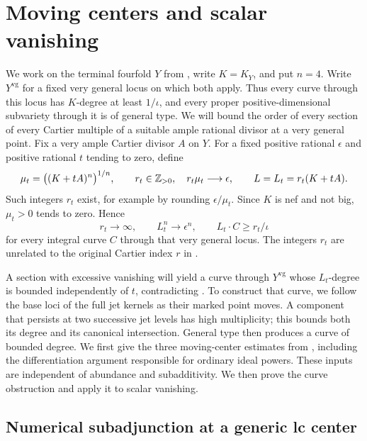 \section{Moving centers and scalar vanishing}
\label{sec:moving-centers}

We work on the terminal fourfold $Y$ from , write
$K=K_Y$, and put $n=4$. Write $Y^{\mathrm{vg}}$ for a fixed very
general locus on which both 
apply. Thus every curve through this locus has $K$-degree at least
$1/\iota$, and every proper positive-dimensional subvariety through
it is of general type. We will bound the order of every section of
every Cartier multiple of a suitable ample rational divisor at a
very general point. Fix a very ample Cartier divisor $A$ on $Y$.
For a fixed positive rational $\epsilon$ and positive rational $t$
tending to zero, define
\begin{equation}
\label{eq:small-volume-polarization}
 \mu_t=\bigl((K+tA)^n\bigr)^{1/n},\qquad
 r_t\in\mathbb Z_{>0},\quad r_t\mu_t\longrightarrow\epsilon,
 \qquad L=L_t=r_t(K+tA).
\end{equation}
Such integers $r_t$ exist, for example by rounding $\epsilon/\mu_t$.
Since $K$ is nef and not big, $\mu_t>0$ tends to zero. Hence
\begin{equation}
\label{eq:small-volume-curve-lower-bound}
 r_t\longrightarrow\infty,\qquad
 L_t^n\longrightarrow\epsilon^n,
 \qquad L_t\cdot C\geq r_t/\iota
\end{equation}
for every integral curve $C$ through that very general locus.
The integers $r_t$ are unrelated to the original Cartier index $r$
in .

A section with excessive vanishing will yield a curve through
$Y^{\mathrm{vg}}$ whose $L_t$-degree is bounded independently of $t$,
contradicting . To construct
that curve, we follow the base loci of the full jet kernels as their
marked point moves. A component that persists at two successive
jet levels has high multiplicity; this bounds both its degree and
its canonical intersection. General type then produces a curve
of bounded degree. We first give the three moving-center estimates
from \cite[Lemmas~7.1--7.4]{OpenAIAbundance2026}, including the
differentiation argument responsible for ordinary ideal powers.
These inputs are independent of abundance and subadditivity. We
then prove the curve obstruction and apply it to scalar vanishing.

\subsection{Numerical subadjunction at a generic lc center}

